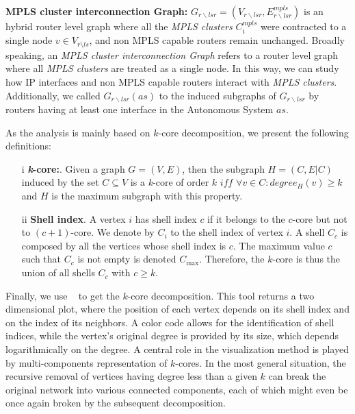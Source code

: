 \textbf{MPLS cluster interconnection Graph:} $G_{r\backslash
lsr}=(V_{r\backslash lsr},E^{mpls}_{r\backslash lsr})$ is an hybrid router level
graph where all the \textit{MPLS clusters}  $C^{mpls}_{i}$ were contracted to a
single node $v\in V_{r\setminus ls}$, and non MPLS capable routers remain
unchanged. Broadly speaking, an \textit{MPLS cluster interconnection Graph}
refers to a router level graph where all \textit{MPLS clusters} are treated as a
single node. In this way, we can study how IP interfaces and non MPLS capable
routers interact with \textit{MPLS clusters}. Additionally, we called
$G_{r\backslash lsr}(as)$ to the induced subgraphs of $G_{r\backslash lsr}$ by
routers having at least one interface in the Autonomous System $as$.

As the analysis is mainly based on $k$-core decomposition, we present the
following definitions:
 

\begin{itemize}
  \item[i]{\textbf{\textit{k}-core:}}. Given a graph $G=(V,E)$, then the
  subgraph $H=(C,E|C)$ induced by the set $ C\subseteq V$ is a \textit{k}-core
  of order $k$ $iff$ $\forall v \in C: degree_{H}(v)\geq k$ and $H$ is the
  maximum subgraph with this property.

  \item[ii]\textbf{Shell index}. A vertex $i$ has shell index $c$ if it belongs
  to the $c$-core but not to $(c+1)$-core. We denote by $C_i$ to the shell index
  of vertex $i$. A shell $C_c$ is composed by all the vertices whose shell index
  is $c$. The maximum value $c$ such that $C_c$ is not empty is denoted
  $C_{\max}$.  Therefore, the $k$-core is thus the union of all shells $C_c$ with
  $c \geq k$.
\end{itemize}

Finally, we use ~\cite{Alvarez06k} to get the $k$-core
decomposition. This tool returns a two dimensional plot, where the position of
each vertex depends on its shell index and on the index of its neighbors.
A color code allows for the identification of shell indices, while the vertex's
original degree is provided by its size, which depends logarithmically on the
degree. A central role in the visualization method is played by multi-components
representation of $k$-cores. In the most general situation, the recursive
removal of vertices having degree less than a given $k$ can break the original
network into various connected components, each of which might even be once
again broken by the subsequent decomposition.

